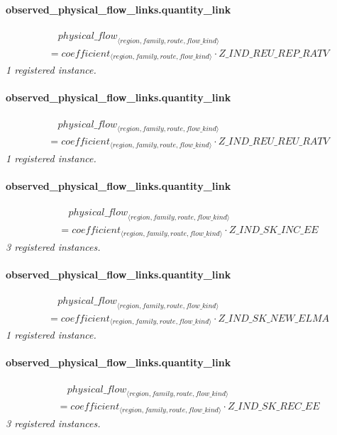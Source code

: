 \documentclass[11pt]{article}
\begin{document}
\paragraph{observed\_physical\_flow\_links.quantity\_link}
\begin{align*}
&\quad {physical\_flow}_{\langle region, family, route, flow\_kind\rangle}\\
&= coefficient_{\langle region, family, route, flow\_kind\rangle} \cdot Z\_IND\_REU\_REP\_RATV
\end{align*}
\noindent\emph{1 registered instance.}\par
\paragraph{observed\_physical\_flow\_links.quantity\_link}
\begin{align*}
&\quad {physical\_flow}_{\langle region, family, route, flow\_kind\rangle}\\
&= coefficient_{\langle region, family, route, flow\_kind\rangle} \cdot Z\_IND\_REU\_REU\_RATV
\end{align*}
\noindent\emph{1 registered instance.}\par
\paragraph{observed\_physical\_flow\_links.quantity\_link}
\begin{align*}
&\quad {physical\_flow}_{\langle region, family, route, flow\_kind\rangle}\\
&= coefficient_{\langle region, family, route, flow\_kind\rangle} \cdot Z\_IND\_SK\_INC\_EE
\end{align*}
\noindent\emph{3 registered instances.}\par
\paragraph{observed\_physical\_flow\_links.quantity\_link}
\begin{align*}
&\quad {physical\_flow}_{\langle region, family, route, flow\_kind\rangle}\\
&= coefficient_{\langle region, family, route, flow\_kind\rangle} \cdot Z\_IND\_SK\_NEW\_ELMA
\end{align*}
\noindent\emph{1 registered instance.}\par
\paragraph{observed\_physical\_flow\_links.quantity\_link}
\begin{align*}
&\quad {physical\_flow}_{\langle region, family, route, flow\_kind\rangle}\\
&= coefficient_{\langle region, family, route, flow\_kind\rangle} \cdot Z\_IND\_SK\_REC\_EE
\end{align*}
\noindent\emph{3 registered instances.}\par
\end{document}
